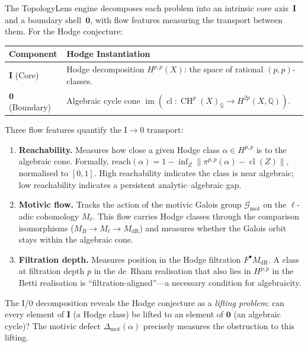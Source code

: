 \documentclass[11pt]{article}
\theoremstyle{definition}
\DeclareMathOperator{\cl}{cl}
\DeclareMathOperator{\CH}{CH}
\DeclareMathOperator{\im}{im}
\begin{document}
The TopologyLens engine decomposes each problem into an intrinsic core
axis~$\mathbf{I}$ and a boundary shell~$\mathbf{0}$, with flow features
measuring the transport between them.  For the Hodge conjecture:

\begin{center}
\begin{tabular}{lp{9cm}}
\hline
\textbf{Component} & \textbf{Hodge Instantiation} \\
\hline
$\mathbf{I}$ (Core) &
  Hodge decomposition $H^{p,p}(X)$: the space of rational $(p,p)$-classes. \\
$\mathbf{0}$ (Boundary) &
  Algebraic cycle cone $\im(\cl : \CH^p(X)_{\mathbb{Q}} \to H^{2p}(X,\mathbb{Q}))$. \\
\hline
\end{tabular}
\end{center}

\noindent
Three flow features quantify the I$\to$0 transport:

\begin{enumerate}
  \item \textbf{Reachability.}  Measures how close a given Hodge class
    $\alpha \in H^{p,p}$ is to the algebraic cone.  Formally,
    $\text{reach}(\alpha) = 1 - \inf_{Z}\|\pi^{p,p}(\alpha) - \cl(Z)\|$,
    normalised to $[0,1]$.  High reachability indicates the class is near
    algebraic; low reachability indicates a persistent analytic--algebraic gap.

  \item \textbf{Motivic flow.}  Tracks the action of the motivic Galois
    group $\mathcal{G}_{\mathrm{mot}}$ on the $\ell$-adic cohomology
    $M_\ell$.  This flow carries Hodge classes through the comparison
    isomorphisms ($M_B \to M_\ell \to M_{\mathrm{dR}}$) and measures
    whether the Galois orbit stays within the algebraic cone.

  \item \textbf{Filtration depth.}  Measures position in the Hodge
    filtration $F^{\bullet} M_{\mathrm{dR}}$.  A class at filtration
    depth $p$ in the de~Rham realisation that also lies in $H^{p,p}$ in
    the Betti realisation is ``filtration-aligned''---a necessary condition
    for algebraicity.
\end{enumerate}

\noindent
The I/0 decomposition reveals the Hodge conjecture as a \emph{lifting problem}:
can every element of $\mathbf{I}$ (a Hodge class) be lifted to an element of
$\mathbf{0}$ (an algebraic cycle)?  The motivic defect
$\Delta_{\mathrm{mot}}(\alpha)$ precisely measures the obstruction to this
lifting.
\end{document}
